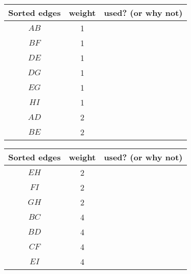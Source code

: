 \documentclass[12pt]{article}
\begin{document}
\begin{center}
\begin{adjustbox}{valign=t,minipage={.5\textwidth}}
\begin{tabular}{ c | c | c }
Sorted edges & weight & used? (or why not) \\ \hline
$AB$ & 1 & \\ \hline
$BF$ & 1  &\\ \hline
$DE$ & 1 & \\ \hline
$DG$ & 1 &\\ \hline 
$EG$ & 1& \\ \hline
$HI$ & 1 & \\ \hline
$AD$ & 2& \\ \hline
 $BE$ & 2& \\  \hline
 \end{tabular}
 \end{adjustbox}
 \begin{adjustbox}{valign=t,minipage={.45\textwidth}}
 \begin{tabular}{ c | c | c }
 Sorted edges & weight & used? (or why not) \\ \hline

$EH$ & 2&\\ \hline
$FI$ & 2&\\ \hline
$GH$ & 2&\\ \hline
$BC$ & 4& \\ \hline
$BD$ & 4& \\ \hline
$CF$ & 4&\\ \hline
$EI$ & 4& \\
\end{tabular}
 \end{adjustbox}
 \hfill

\end{center}
\end{document}
